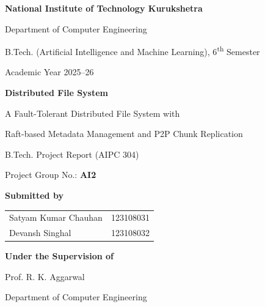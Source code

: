 \documentclass[12pt,a4paper]{report}
\begin{document}
\begin{titlepage}
    \centering
    \vspace*{0.5cm}
    {\large \textbf{National Institute of Technology Kurukshetra}\par}
    {\large Department of Computer Engineering\par}
    \vspace{0.3cm}
    {\normalsize B.Tech. (Artificial Intelligence and Machine Learning), 6\textsuperscript{th} Semester\par}
    {\normalsize Academic Year 2025--26\par}

    \vspace{1.5cm}
    {\Huge \textbf{Distributed File System}\par}
    \vspace{0.4cm}
    {\Large A Fault-Tolerant Distributed File System with\par}
    {\Large Raft-based Metadata Management and P2P Chunk Replication\par}

    \vspace{1cm}
    {\large B.Tech. Project Report (AIPC 304)\par}
    {\large Project Group No.: \textbf{AI2}\par}

    \vspace{1.5cm}
    {\large \textbf{Submitted by}\par}
    \vspace{0.3cm}
    \begin{tabular}{ll}
        Satyam Kumar Chauhan & 123108031 \\[4pt]
        Devansh Singhal & 123108032 \\
    \end{tabular}

    \vspace{2cm}
    {\large \textbf{Under the Supervision of}\par}
    \vspace{0.2cm}
    {\large Prof. R. K. Aggarwal\par}
    {\normalsize Department of Computer Engineering\par}

\end{titlepage}

\end{document}
